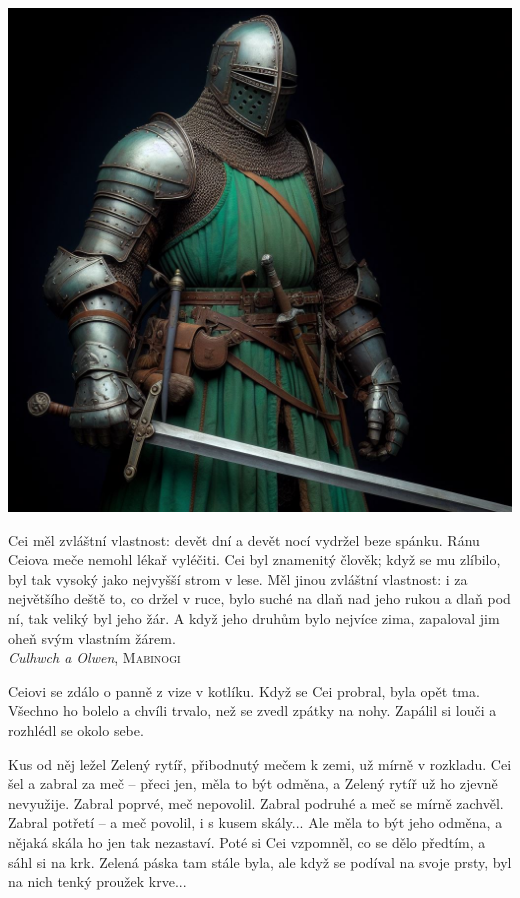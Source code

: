 \documentclass[a4paper,twocolumn,openany,nodeprecatedcode, justified]{dndbook}
\begin{document}
	\noindent
	\includegraphics[width=\linewidth]{GreenKnightPlain.jpg}
	
	\vspace{2\baselineskip}
	
	\begin{DndReadAloud}
		\sffamily
		\raggedright
		Cei měl zvláštní vlastnost: devět dní a devět nocí vydržel beze spánku. Ránu Ceiova meče nemohl lékař vyléčiti. Cei byl znamenitý člověk; když se mu zlíbilo, byl tak vysoký jako nejvyšší strom v lese. Měl jinou zvláštní vlastnost: i za největšího deště to, co držel v ruce, bylo suché na dlaň nad jeho rukou a dlaň pod ní, tak veliký byl jeho žár. A když jeho druhům bylo nejvíce zima, zapaloval jim oheň svým vlastním žárem.\\
		\raggedleft \emph{Culhwch a Olwen}, \textsc{Mabinogi}
	\end{DndReadAloud}
	
	Ceiovi se zdálo o panně z vize v kotlíku. Když se Cei probral, byla opět tma. Všechno ho bolelo a chvíli trvalo, než se zvedl zpátky na nohy. Zapálil si louči a rozhlédl se okolo sebe.
	
	Kus od něj ležel Zelený rytíř, přibodnutý mečem k zemi, už mírně v rozkladu. Cei šel a zabral za meč -- přeci jen, měla to být odměna, a Zelený rytíř už ho zjevně nevyužije. Zabral poprvé, meč nepovolil. Zabral podruhé a meč se mírně zachvěl. Zabral potřetí -- a meč povolil, i s kusem skály... Ale měla to být jeho odměna, a nějaká skála ho jen tak nezastaví. Poté si Cei vzpomněl, co se dělo předtím, a sáhl si na krk. Zelená páska tam stále byla, ale když se podíval na svoje prsty, byl na nich tenký proužek krve...
	
\end{document}
